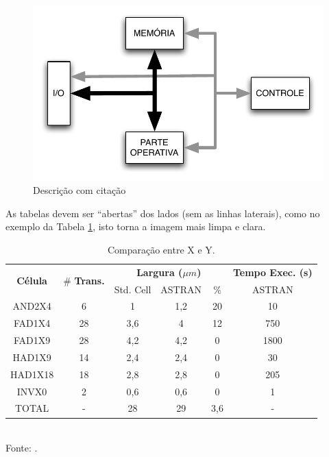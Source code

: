 \begin{figure}
    \caption[Descrição com citação]{Descrição com citação \cite{artigo}}
    \centerline{\includegraphics[width=40em]{figuras/dsp}}
    \label{fig:dsp2}
\end{figure}

As tabelas devem ser ``abertas'' dos lados (sem as linhas laterais), como no exemplo da Tabela \ref{tab:comp1}, isto torna a imagem mais limpa e clara.

\begin{table}
    \centering
    \caption{Comparação entre X e Y.}
    \begin{tabular}{c|c|c|c|c|c} \hline
        \multirow{2}{*}{\bf{Célula}} & \multirow{2}{*}{\# \bf{Trans.}} & \multicolumn{3}{|c|}{\bf{Largura} ($\mu m$)} & \bf{Tempo Exec. (s)}\\ \cline{3-6} 
         &  & Std. Cell & ASTRAN & \% & ASTRAN \\ \hline \hline
        AND2X4& 6 & 1 & 1,2 & 20 & 10 \\ \hline
        FAD1X4& 28 & 3,6 & 4 & 12 & 750\\ \hline
        FAD1X9& 28 & 4,2 & 4,2 & 0 & 1800\\ \hline
        HAD1X9& 14 & 2,4 & 2,4 & 0 & 30\\ \hline
        HAD1X18& 18 & 2,8 & 2,8 & 0 & 205\\ \hline
        INVX0 & 2 & 0,6 & 0,6 & 0 & 1\\ \hline
        TOTAL& - & 28 & 29 & 3,6 &-\\ \hline
    \end{tabular}
    {\\ Fonte: \cite{artigo}.}
    \label{tab:comp1}
\end{table}

